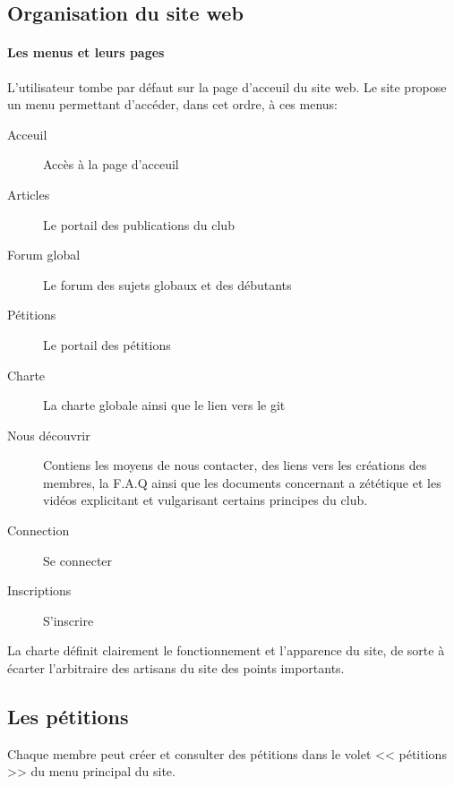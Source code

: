 \documentclass[a4paper,12pt]{article}
\begin{document}
\subsection{Organisation du site web}
\paragraph{Les menus et leurs pages}
L'utilisateur tombe par défaut sur la page d'acceuil du site web. Le site propose un menu permettant d'accéder, dans cet ordre, à ces menus:
\begin{description}
 \item [Acceuil] Accès à la page d'acceuil
 \item [Articles] Le portail des publications du club
 \item [Forum global] Le forum des sujets globaux et des débutants
 \item [Pétitions] Le portail des pétitions
 \item [Charte] La charte globale ainsi que le lien vers le git
 \item [Nous découvrir] Contiens les moyens de nous contacter, des liens vers les créations des membres, la F.A.Q ainsi que les documents concernant a zététique et les vidéos explicitant et vulgarisant certains principes du club.
 \item [Connection] Se connecter
 \item [Inscriptions] S'inscrire
\end{description}


La charte définit clairement le fonctionnement et l'apparence du site, de sorte à écarter l'arbitraire des artisans du site des points importants.
\subsection{Les pétitions}
Chaque membre peut créer et consulter des pétitions dans le volet << pétitions >> du menu principal du site.
\end{document}
